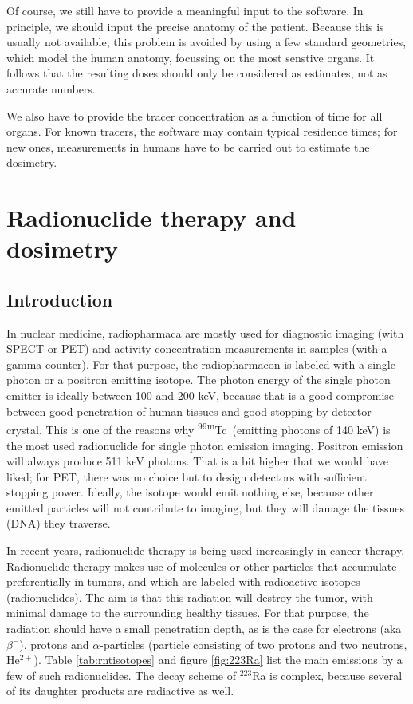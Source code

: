 \documentclass[11pt,oneside]{book}
\begin{document}
Of course, we still have to provide a meaningful input to the
software. In principle, we should input the precise anatomy of the
patient. Because this is usually not available, this problem is
avoided by using a few standard geometries, which model the human
anatomy, focussing on the most senstive organs. It follows that the
resulting doses should only be considered as estimates, not as
accurate numbers.

We also have to provide the tracer concentration as a function of time
for all organs.  For known tracers, the software may contain typical
residence times; for new ones, measurements in humans have to be
carried out to estimate the dosimetry.


\chapter{Radionuclide therapy and dosimetry}

\section{Introduction}
In nuclear medicine, radiopharmaca are mostly used for diagnostic
imaging (with SPECT or PET) and activity concentration measurements in
samples (with a gamma counter). For that purpose, the radiopharmacon is
labeled with a single photon or a positron emitting isotope. The
photon energy of the single photon emitter is ideally between 100 and
200 keV, because that is a good compromise between good penetration of
human tissues and good stopping by detector crystal. This is one of
the reasons why \textsuperscript{99m}Tc\ (emitting photons of 140 keV) is the most used
radionuclide for single photon emission imaging. Positron emission will
always produce 511 keV photons. That is a bit higher that we would
have liked; for PET, there was no choice but to design detectors with
sufficient stopping power. Ideally, the isotope would emit nothing
else, because other emitted particles will not contribute to imaging,
but they will damage the tissues (DNA) they traverse.

In recent years, radionuclide therapy is being used increasingly in
cancer therapy. Radionuclide therapy makes use of molecules or other
particles that accumulate preferentially in tumors, and which are
labeled with radioactive isotopes (radionuclides). The aim is that
this radiation will destroy the tumor, with minimal damage to the
surrounding healthy tissues. For that purpose, the radiation should
have a small penetration depth, as is the case for electrons (aka
$\beta^-$), protons and $\alpha$-particles (particle consisting of two
protons and two neutrons, He$^{2+}$). Table \ref{tab:rntisotopes} and
figure \ref{fig:223Ra} list the main emissions by a few of such
radionuclides. The decay scheme of $^{223}$Ra is complex, because several
of its daughter products are radiactive as well.
\end{document}
